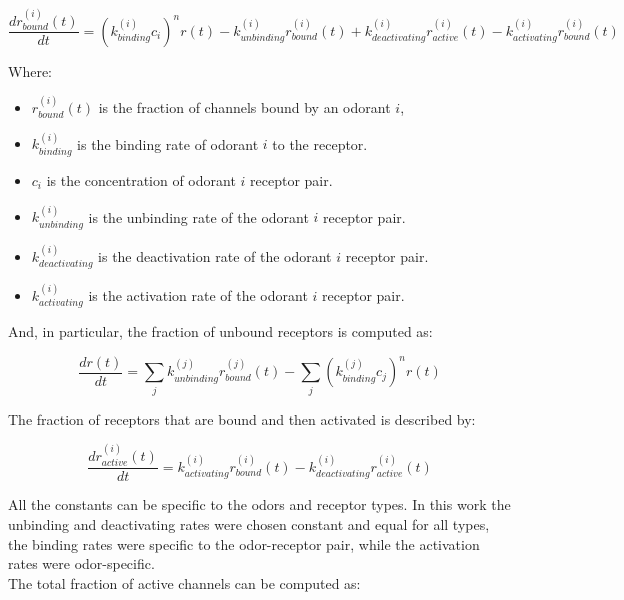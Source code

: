   \begin{equation}
  \frac{dr^{(i)}_{bound}(t)}{dt} = (k_{binding}^{(i)}c_i)^nr(t) - k_{unbinding}^{(i)}r^{(i)}_{bound}(t) + k_{deactivating}^{(i)}r_{active}^{(i)}(t) - k_{activating}^{(i)}r^{(i)}_{bound}(t)
  \label{eqs:bound-receptors}
  \end{equation}

  Where:

  \begin{multicols}{2}
    \begin{itemize}
      \item $r^{(i)}_{bound}(t)$ is the fraction of channels bound by an odorant  $i$,
      \item $k_{binding}^{(i)}$ is the binding rate of odorant $i$ to the receptor.
      \item $c_i$ is the concentration of odorant $i$ receptor pair.
      \item $k_{unbinding}^{(i)}$ is the unbinding rate of the odorant $i$ receptor pair.
      \item $k_{deactivating}^{(i)}$ is the deactivation rate of the odorant $i$ receptor pair.
      \item $k_{activating}^{(i)}$ is the activation rate of the odorant $i$ receptor pair.
    \end{itemize}
  \end{multicols}

  And, in particular, the fraction of unbound receptors is computed as:

  \begin{equation}
    \frac{dr(t)}{dt} = \sum\limits_{j} k_{unbinding}^{(j)}r_{bound}^{(j)}(t) - \sum\limits_{j}(k_{binding}^{(j)}c_j)^nr(t)
  \end{equation}

  The fraction of receptors that are bound and then activated is described by:

  \begin{equation}
    \frac{dr_{active}^{(i)}(t)}{dt} = k_{activating}^{(i)} r^{(i)}_{bound}(t) - k_{deactivating}^{(i)}r_{active}^{(i)}(t)
  \end{equation}

  All the constants can be specific to the odors and receptor types.
  In this work the unbinding and deactivating rates were chosen constant and equal for all types, the binding rates were specific to the odor-receptor pair, while the activation rates were odor-specific.\\
  The total fraction of active channels can be computed as:

